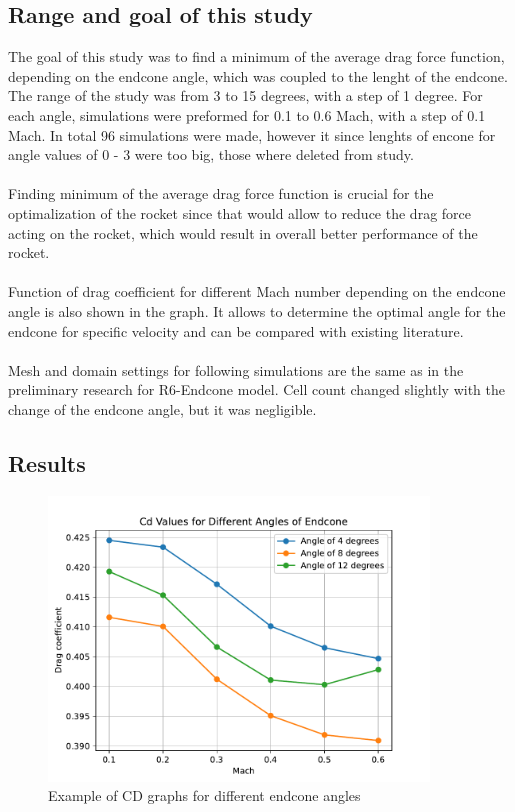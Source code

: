 \documentclass{article}
\begin{document}
\subsection{Range and goal of this study}
The goal of this study was to find a minimum of the average drag force function, depending on
the endcone angle, which was coupled to the lenght of the endcone. The range of the
study was from 3 to 15 degrees, with a step of 1 degree. For each angle, simulations were preformed for 
0.1 to 0.6 Mach, with a step of 0.1 Mach. In total 96 simulations were made, however it since 
lenghts of encone for angle values of 0 - 3 were too big, those where deleted from study.\\\\
Finding minimum of the average drag force function is crucial for the optimalization of the rocket
since that would allow to reduce the drag force acting on the rocket, which would result in
overall better performance of the rocket.\\\\
Function of drag coefficient for different Mach number depending on the endcone angle is also 
shown in the graph. It allows to determine the optimal angle for the endcone for specific
velocity and can be compared with existing literature.\\\\
Mesh and domain settings for following simulations are the same as in the preliminary research for
R6-Endcone model. Cell count changed slightly with the change of the endcone angle, but it was
negligible.

\subsection{Results}

\begin{figure}[H]
    \centering
    \includegraphics[width=0.9\textwidth]{../data/R6-Parametric-Endcone/ExampleCdGraphs.pdf}
    \caption{Example of CD graphs for different endcone angles}
\end{figure}
\end{document}
